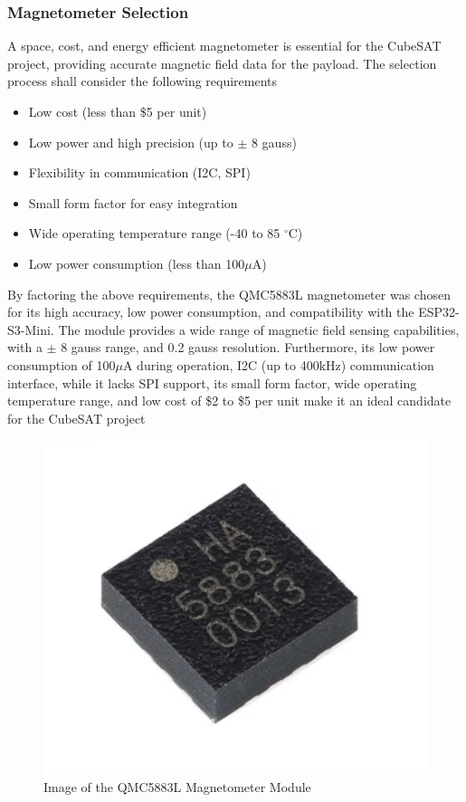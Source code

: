 \documentclass{report}
\begin{document}
                \subsubsection{Magnetometer Selection}
                    A space, cost, and energy efficient magnetometer is essential for the CubeSAT project,
                    providing accurate magnetic field data for the payload. The selection process shall consider
                    the following requirements
                    \begin{itemize}
                        \item Low cost (less than \$5 per unit)
                        \item Low power and high precision (up to $\pm$ 8 gauss)
                        \item Flexibility in communication (I2C, SPI)
                        \item Small form factor for easy integration
                        \item Wide operating temperature range (-40 to 85 $^\circ$C)
                        \item Low power consumption (less than 100$\mu$A)
                    \end{itemize}
                    By factoring the above requirements, the QMC5883L magnetometer was chosen for its high accuracy,
                    low power consumption, and compatibility with the ESP32-S3-Mini. The module provides a wide range of magnetic field sensing capabilities,
                    with a $\pm$ 8 gauss range, and 0.2 gauss resolution. Furthermore, its low power consumption of 100$\mu$A during operation, I2C (up to 400kHz) communication interface,
                    while it lacks SPI support, its small form factor, wide operating temperature range, and low cost of \$2 to \$5 per unit make it an ideal candidate for the CubeSAT project \cite{qmcdatasheet}
                    \begin{figure}[H]
                        \centering
                        \includegraphics[width=0.2\linewidth]{figures/MAG_IMG.png}
                        \caption{Image of the QMC5883L Magnetometer Module}
                        \label{fig:mag_img}
                    \end{figure}
\end{document}
